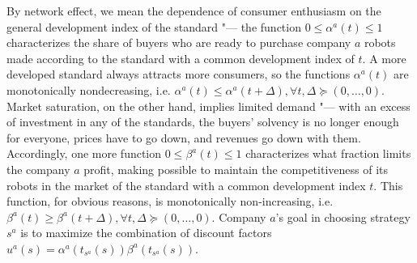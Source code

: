 By network effect, we mean the dependence of consumer enthusiasm on the general development index of the standard "--- the function $0 \le \alpha^a(t) \le 1$ characterizes the share of buyers who are ready to purchase company $a$ robots made according to the standard with a common development index of $t$. A more developed standard always attracts more consumers, so the functions $\alpha^a(t)$ are monotonically nondecreasing, i.e. $\alpha^a(t) \le \alpha^a(t + \Delta), \forall t, \Delta \succeq (0, \ldots, 0)$. Market saturation, on the other hand, implies limited demand "--- with an excess of investment in any of the standards, the buyers' solvency is no longer enough for everyone, prices have to go down, and revenues go down with them. Accordingly, one more function $0 \le \beta^a(t) \le 1$ characterizes what fraction limits the company $a$ profit, making possible to maintain the competitiveness of its robots in the market of the standard with a common development index $t$. This function, for obvious reasons, is monotonically non-increasing, i.e. $\beta^a(t) \ge \beta^a(t + \Delta), \forall t, \Delta \succeq (0, \ldots, 0)$. Company $a$'s goal in choosing strategy $s^a$ is to maximize the combination of discount factors $u^a(s) = \alpha^a(t_{s^a}(s)) \beta^a(t_{s^a}(s))$. %

